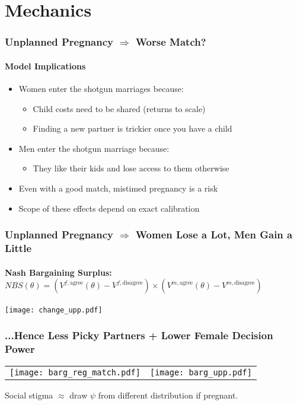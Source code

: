 \documentclass[aspectratio=169]{beamer}
\let\olditem\item
\renewcommand{\item}{%
\olditem\vspace{\fill}}
\begin{document}
\section{Mechanics}
\begin{frame}
\frametitle{Unplanned Pregnancy $\Rightarrow$ Worse Match?}
\framesubtitle{Model Implications}

\begin{itemize}
\item Women enter the shotgun marriages because:
\begin{itemize}
\item Child costs need to be shared (returns to scale)
\item Finding a new partner is trickier once you have a child
\end{itemize}
\item Men enter the shotgun marriage because:
\begin{itemize}
\item They like their kids and lose access to them otherwise
\end{itemize}
\item Even with a good match, mistimed pregnancy is a risk
\item Scope of these effects depend on exact calibration
\end{itemize}
\end{frame}


\begin{frame}
\frametitle{Unplanned Pregnancy $\Rightarrow$ Women Lose a Lot, Men Gain a Little}
\framesubtitle{Nash Bargaining Surplus: $NBS(\theta) = (V^{f,\text{agree}}(\theta) - V^{f,\text{disagree}})\times(V^{m,\text{agree}}(\theta) - V^{m,\text{disagree}})$}
\begin{center}
\texttt{[image: change\_upp.pdf]}
\end{center}

\end{frame}

\begin{frame}
\frametitle{...Hence Less Picky Partners + Lower Female Decision Power}
\begin{center}
\begin{tabular}{c c}
\hspace{-1cm} \texttt{[image: barg\_reg\_match.pdf]} & \texttt{[image: barg\_upp.pdf]}
\end{tabular}
\end{center}
Social stigma $\approx$ draw $\psi$ from different distribution if pregnant.  %
\end{frame}
\end{document}

